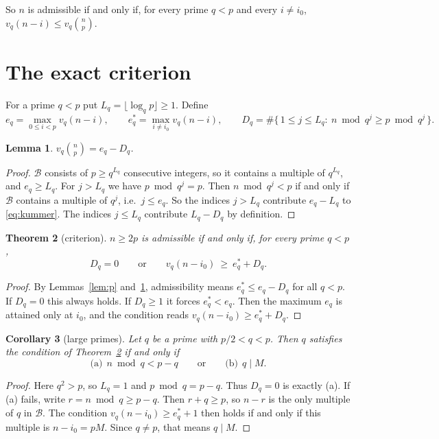 \documentclass[11pt]{article}
\newtheorem{theorem}{Theorem}
\newtheorem{lemma}[theorem]{Lemma}
\newtheorem{corollary}[theorem]{Corollary}
\theoremstyle{remark}
\begin{document}
So $n$ is admissible if and only if, for every prime $q<p$ and every $i\ne i_0$, $v_q(n-i)\le v_q\binom np$.

\section{The exact criterion}

For a prime $q<p$ put $L_q=\lfloor\log_q p\rfloor\ge1$. Define
\[
e_q=\max_{0\le i<p}v_q(n-i),\qquad e_q^{*}=\max_{i\ne i_0}v_q(n-i),\qquad
D_q=\#\{\,1\le j\le L_q:\ n\bmod q^j\ge p\bmod q^j\,\}.
\]

\begin{lemma}\label{lem:val}
$v_q\binom np=e_q-D_q$.
\end{lemma}
\begin{proof}
$\mathcal B$ consists of $p\ge q^{L_q}$ consecutive integers, so it contains a multiple of $q^{L_q}$, and $e_q\ge L_q$. For $j>L_q$ we have $p\bmod q^j=p$. Then $n\bmod q^j<p$ if and only if $\mathcal B$ contains a multiple of $q^j$, i.e.\ $j\le e_q$. So the indices $j>L_q$ contribute $e_q-L_q$ to \eqref{eq:kummer}. The indices $j\le L_q$ contribute $L_q-D_q$ by definition.
\end{proof}

\begin{theorem}[criterion]\label{thm:crit}
$n\ge 2p$ is admissible if and only if, for every prime $q<p$,
\[
D_q=0\qquad\text{or}\qquad v_q(n-i_0)\ \ge\ e_q^{*}+D_q .
\]
\end{theorem}
\begin{proof}
By Lemmas~\ref{lem:p} and~\ref{lem:val}, admissibility means $e_q^{*}\le e_q-D_q$ for all $q<p$. If $D_q=0$ this always holds. If $D_q\ge1$ it forces $e_q^{*}<e_q$. Then the maximum $e_q$ is attained only at $i_0$, and the condition reads $v_q(n-i_0)\ge e_q^{*}+D_q$.
\end{proof}

\begin{corollary}[large primes]\label{cor:large}
Let $q$ be a prime with $p/2<q<p$. Then $q$ satisfies the condition of Theorem~\ref{thm:crit} if and only if
\[
\text{(a)}\ \ n\bmod q<p-q\qquad\text{or}\qquad\text{(b)}\ \ q\mid M .
\]
\end{corollary}
\begin{proof}
Here $q^2>p$, so $L_q=1$ and $p\bmod q=p-q$. Thus $D_q=0$ is exactly (a). If (a) fails, write $r=n\bmod q\ge p-q$. Then $r+q\ge p$, so $n-r$ is the only multiple of $q$ in $\mathcal B$. The condition $v_q(n-i_0)\ge e_q^{*}+1$ then holds if and only if this multiple is $n-i_0=pM$. Since $q\ne p$, that means $q\mid M$.
\end{proof}
\end{document}
